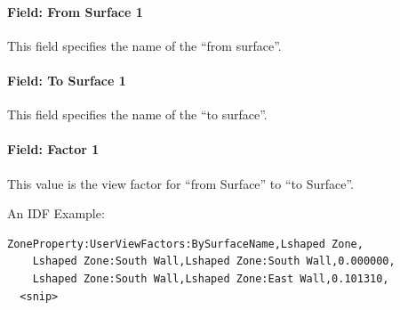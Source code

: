 \paragraph{Field: From Surface 1}\label{field-from-surface-1}

This field specifies the name of the ``from surface''.

\paragraph{Field: To Surface 1}\label{field-to-surface-1}

This field specifies the name of the ``to surface''.

\paragraph{Field: Factor 1}\label{field-factor-1}

This value is the view factor for ``from Surface'' to ``to Surface''.

An IDF Example:

\begin{lstlisting}
ZoneProperty:UserViewFactors:BySurfaceName,Lshaped Zone,
    Lshaped Zone:South Wall,Lshaped Zone:South Wall,0.000000,
    Lshaped Zone:South Wall,Lshaped Zone:East Wall,0.101310,
  <snip>
\end{lstlisting}
